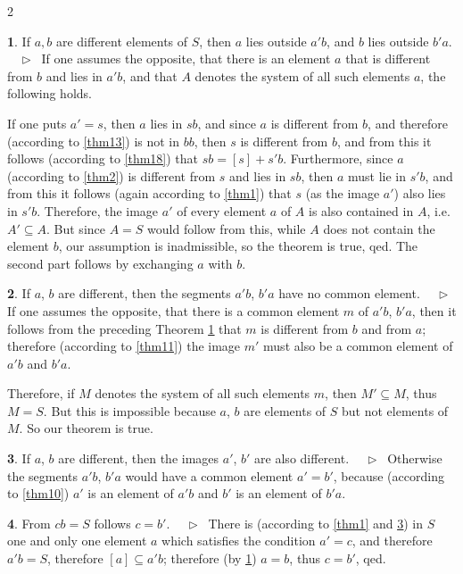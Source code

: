 \documentclass[leqno,hidelinks,10pt]{article}
\theoremstyle{definition}
\newtheorem{satz}{\protect\satzname}
\newcommand{\satzname}{}
\renewcommand{\satzname}{\hspace{-4pt}.\ Satz}%
\renewcommand{\satzname}{\hspace{-4pt}.\ Theorem}%
\newcommand\Beweis{\medskip \newline $ \phantom{'.'} \rhd \ $}%
\newcommand{\partof}{\subseteq}
\newcommand{\sref}[1]{\underline{\ref{#1}}}%
\begin{document}
\begin{paracol}{2}
\begin{rightcolumn}
\newpage

\begin{satz}\label{thm19}
If $a, b$ are different elements of $S$, then $a$ lies outside $a'b$, and $b$ lies
outside $b'a$.
\Beweis
If one assumes the opposite, that there is an element $a$ that is different from
$b$ and lies in $a'b$, and that $A$ denotes the system of all such elements $a$,
the following holds.

If one puts $a'=s$, then $a$ lies in $sb$, and since $a$ is different from $b$,
and therefore (according to \sref{thm13}) is not in $bb$, then $s$ is different
from $b$, and from this it follows (according to \sref{thm18}) that $sb = [s] + s'b$.
Furthermore, since $a$ (according to \sref{thm2}) is different from $s$ and lies
in $sb$, then $a$ must lie in $s'b$, and from this it follows (again according to
\sref{thm1}) that $s$ (as the image $a'$) also lies in $s'b$. %
Therefore, the image $a'$ of every element $a$ of $A$ is also contained in $A$,
i.e. $A' \partof A$. But since $A=S$ would follow from this, while $A$ does not
contain the element $b$, our assumption is inadmissible, so the theorem is true,
qed.
The second part follows by exchanging $a$ with $b$.%
\end{satz}

\begin{satz}\label{thm20}
If $a$, $b$ are different, then the segments $a'b$, $b'a$ have no common element.
\Beweis
If one assumes the opposite, that there is a common element $m$ of $a'b$, $b'a$,
then it follows from the preceding Theorem \sref{thm19} that $m$ is different from
$b$ and from $a$; therefore (according to \sref{thm11}) the image $m'$ must also be
a common element of $a'b$ and $b'a$.%

Therefore, if $M$ denotes the system of all such elements $m$, then $M' \partof M$,
thus $M=S$. But this is impossible because $a$, $b$ are elements of $S$ but not
elements of $M$. So our theorem is true.%
\ \\
\end{satz}

\begin{satz}\label{thm21}
If $a$, $b$ are different, then the images $a'$, $b'$ are also different.
\Beweis
Otherwise the segments $a'b$, $b'a$ would have a common element $a'=b'$, because
(according to \sref{thm10}) $a'$ is an element of $a'b$ and $b'$ is an element
of $b'a$.%
\end{satz}

\begin{satz}\label{thm22}
From $cb=S$ follows $c = b'$.
\Beweis
There is (according to \sref{thm1} and \sref{thm21}) in $S$ one and only one element
$a$ which satisfies the condition $a'=c$, and therefore $a'b = S$, therefore
$[a] \partof a'b$; therefore (by \sref{thm19}) $a=b$, thus $c=b'$, qed.%
\end{satz}


\end{rightcolumn}
\end{paracol}
\end{document}
